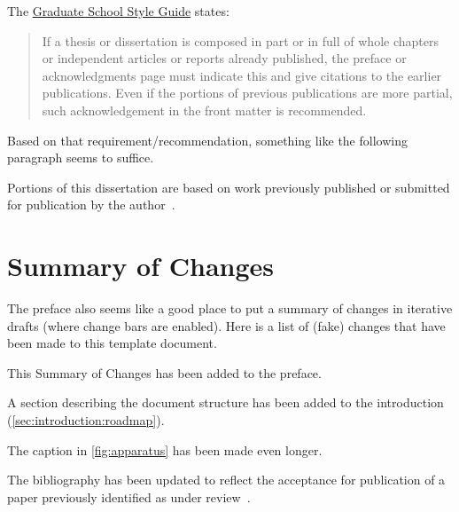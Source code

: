 The \href{http://gsnb.rutgers.edu/guide.php3}{Graduate School Style Guide} states:
\begin{quotation}
If a thesis or dissertation is composed in part or in full of whole chapters or independent articles or reports already published, the preface or acknowledgments page must indicate this and give citations to the earlier publications.
Even if the portions of previous publications are more partial, such acknowledgement in the front matter is recommended.
\end{quotation}
Based on that requirement/recommendation, something like the following paragraph seems to suffice.

\ifperchapterbib%
\else\fi%
Portions of this dissertation are based on work previously published or submitted for publication by the author~\citep{Edmunds:2006:ISMAR,Edmunds:2008:HAPTICS,Edmunds:2009:WHC}.
%
\ifchangebars%
\section*{\protect{\cbstart}Summary of Changes}%
The preface also seems like a good place to put a summary of changes in iterative drafts (where change bars are enabled).
Here is a list of (fake) changes that have been made to this template document.
\begin{list}{}{\topsep 0pt%
               \baselineskip}%
\item This Summary of Changes has been added to the preface.
\ifIntro%
\ifperchapterbib%
\item A section describing the document structure has been added to the introduction (\autoref{sec:introduction:roadmap}).
\else\fi%
\else\fi%
\ifUsefulTechniques%
\item The caption in \autoref{fig:apparatus} has been made even longer.
\else\fi%
\item The bibliography has been updated to reflect the acceptance for publication of a paper previously identified as under review~\citep{Edmunds:2009:WHC}.
\end{list}%
\cbend%
\else\fi%
